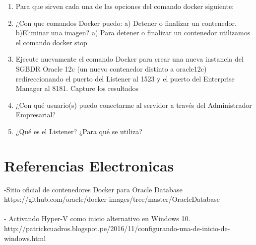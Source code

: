 \documentclass[12pt,letterpaper]{article}
\begin{document}
\begin{enumerate}[1.]
    \item  Para que sirven cada una de las opciones del comando docker siguiente:
     
    \item ¿Con que comandos Docker puedo: a) Detener o finalizar un contenedor. b)Eliminar una
imagen?
a) Para detener o finalizar un contenedor utilizamos el comando  docker stop



\item Ejecute nuevamente el comando Docker para crear una nueva instancia del SGBDR Oracle
12c (un nuevo contenedor distinto a oracle12c) redireccionando el puerto del Listener al 1523
y el puerto del Enterprise Manager al 8181. Capture los resultados



\item ¿Con qué usuario(s) puedo conectarme al servidor a través del Administrador Empresarial?

\item ¿Qué es el Listener? ¿Para qué se utiliza?


		\end{enumerate}


\section{Referencias Electronicas } 

-Sitio oficial de contenedores Docker para Oracle Database\\
https://github.com/oracle/docker-images/tree/master/OracleDatabase\\ \\
- Activando Hyper-V como inicio alternativo en Windows 10.\\
http://patrickcuadros.blogspot.pe/2016/11/configurando-una-de-inicio-de-windows.html
\end{document}
